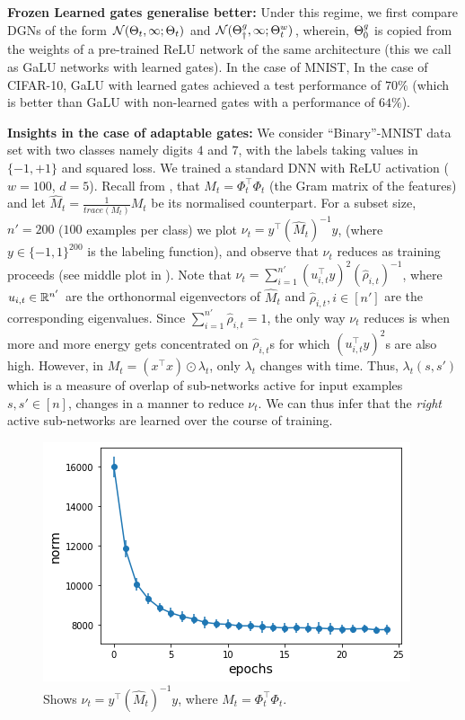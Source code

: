 \textbf{Frozen Learned gates generalise better:} Under this regime, we first compare DGNs of the form $\mathcal{N}(\Theta_t,\infty;\Theta_t)$ and $\mathcal{N}({\Theta}^g_{\dagger},\infty;{\Theta}^w_t)$, wherein, ${\Theta}^g_0$ is copied from the weights of a pre-trained ReLU network of the same architecture (this we call as GaLU networks with learned gates). In the case of MNIST, 
In the case of CIFAR-10, GaLU with learned gates achieved a test performance of $70\%$ (which is better than GaLU with non-learned gates with a performance of  $64\%$).




\textbf{Insights in the case of adaptable gates:} We consider ``Binary''-MNIST data set with two classes namely digits $4$ and $7$, with the labels taking values in $\{-1,+1\}$ and squared loss. We trained a standard DNN with ReLU activation ($w=100$, $d=5$). Recall from , that $M_t=\Phi^\top_t\Phi_t$  (the Gram matrix of the features) and let $\widehat{M}_t=\frac{1}{trace(M_t)}M_t$ be its normalised counterpart. For a subset size, $n'=200$ ($100$ examples per class) we plot $\nu_t=y^\top (\widehat{M}_t)^{-1} y$, (where $y\in\{-1,1\}^{200}$ is the labeling function), and observe that $\nu_t$ reduces as training proceeds (see middle plot in ). Note that $\nu_t=\sum_{i=1}^{n'}(u_{i,t}^\top y)^2 (\hat{\rho}_{i,t})^{-1}$, where $u_{i,t}\in \mathbb{R}^{n'}$ are the orthonormal eigenvectors of $\widehat{M}_t$ and $\hat{\rho}_{i,t},i\in[n']$ are the corresponding eigenvalues. Since $\sum_{i=1}^{n'}\hat{\rho}_{i,t}=1$, the only way $\nu_t$ reduces is when more and more energy gets concentrated on $\hat{\rho}_{i,t}$s for which $(u_{i,t}^\top y)^2$s are also high. However, in $M_t=(x^\top x)\odot \lambda_t$, only $\lambda_t$ changes with time. Thus, $\lambda_t(s,s')$ which is a measure of overlap of sub-networks active for input examples $s,s'\in[n]$, changes in a manner to reduce $\nu_t$. We can thus infer that the \emph{right} active sub-networks are learned over the course of training.

\begin{figure}
\centering
\includegraphics[scale=0.5]{figs/path-gram.png}
\caption{Shows $\nu_t=y^\top (\widehat{M}_t)^{-1}y$, where $M_t=\Phi_t^\top \Phi_t$.}
\label{fig:path-norm}
\end{figure}

